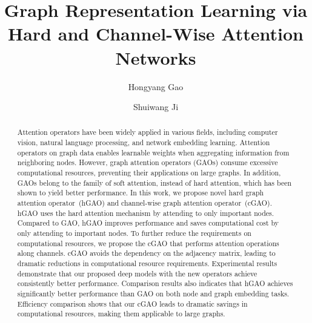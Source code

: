 \documentclass[sigconf]{acmart}
\begin{document}

\fancyhead{}

\title{Graph Representation Learning via Hard and Channel-Wise Attention Networks}




\author{Hongyang Gao}

\author{Shuiwang Ji}

\renewcommand{\shortauthors}{H. Gao, et al.}

\begin{abstract}

Attention operators have been widely applied in various fields,
including computer vision, natural language processing, and network
embedding learning. Attention operators on graph data enables
learnable weights when aggregating information from neighboring
nodes. However, graph attention operators (GAOs) consume excessive
computational resources, preventing their applications on large
graphs. In addition, GAOs belong to the family of soft attention,
instead of hard attention, which has been shown to yield better
performance. In this work, we propose novel hard graph attention
operator~(hGAO) and channel-wise graph attention operator~(cGAO).
hGAO uses the hard attention mechanism by attending to only
important nodes. Compared to GAO, hGAO improves performance and
saves computational cost by only attending to important nodes. To
further reduce the requirements on computational resources, we
propose the cGAO that performs attention operations along channels.
cGAO avoids the dependency on the adjacency matrix, leading to
dramatic reductions in computational resource requirements.
Experimental results demonstrate that our proposed deep models with
the new operators achieve consistently better performance.
Comparison results also indicates that hGAO achieves significantly
better performance than GAO on both node and graph embedding tasks.
Efficiency comparison shows that our cGAO leads to dramatic savings
in computational resources, making them applicable to large graphs.

\end{abstract}
\end{document}
